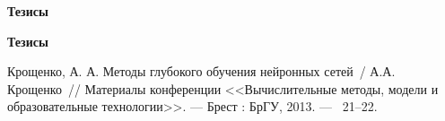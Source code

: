 


\ifx\isabstract\undefined 
\begin{center}
\vspace{3mm}
{\bf Тезисы}
\vspace{3mm}
\end{center}
\else
\vspace{2mm}
{\bf Тезисы}
\vspace{2mm}
\fi

Крощенко, А. А. Методы глубокого обучения нейронных сетей~/ А.А. Крощенко~// 
 Материалы конференции <<Вычислительные методы, модели и образовательные технологии>>. ---
\newblock Брест : БрГУ, 2013. ---
~21--22.

